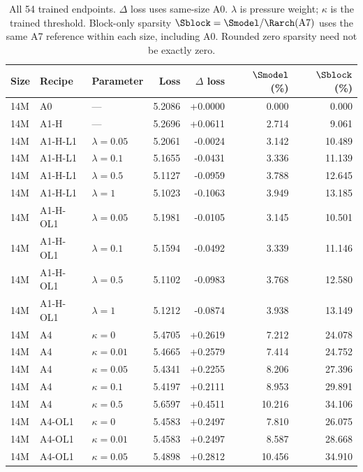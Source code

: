 \begin{table}[p]\centering\small\renewcommand{\arraystretch}{0.95}
\caption{All 54 trained endpoints. $\Delta$ loss uses same-size A0. $\lambda$ is pressure weight; $\kappa$ is the trained threshold. Block-only sparsity $\Sblock=\Smodel/\Rarch(\mathrm{A7})$ uses the same A7 reference within each size, including A0. Rounded zero sparsity need not be exactly zero.}\label{tab:trained-endpoints}
\begin{tabular}{@{}lllrrrr@{}}
\toprule
Size & Recipe & Parameter & Loss & $\Delta$ loss & $\Smodel$ (\%) & $\Sblock$ (\%) \\
\midrule
14M & A0 & --- & 5.2086 & +0.0000 & 0.000 & 0.000 \\
14M & A1-H & --- & 5.2696 & +0.0611 & 2.714 & 9.061 \\
14M & A1-H-L1 & $\lambda=0.05$ & 5.2061 & -0.0024 & 3.142 & 10.489 \\
14M & A1-H-L1 & $\lambda=0.1$ & 5.1655 & -0.0431 & 3.336 & 11.139 \\
14M & A1-H-L1 & $\lambda=0.5$ & 5.1127 & -0.0959 & 3.788 & 12.645 \\
14M & A1-H-L1 & $\lambda=1$ & 5.1023 & -0.1063 & 3.949 & 13.185 \\
14M & A1-H-OL1 & $\lambda=0.05$ & 5.1981 & -0.0105 & 3.145 & 10.501 \\
14M & A1-H-OL1 & $\lambda=0.1$ & 5.1594 & -0.0492 & 3.339 & 11.146 \\
14M & A1-H-OL1 & $\lambda=0.5$ & 5.1102 & -0.0983 & 3.768 & 12.580 \\
14M & A1-H-OL1 & $\lambda=1$ & 5.1212 & -0.0874 & 3.938 & 13.149 \\
14M & A4 & $\kappa=0$ & 5.4705 & +0.2619 & 7.212 & 24.078 \\
14M & A4 & $\kappa=0.01$ & 5.4665 & +0.2579 & 7.414 & 24.752 \\
14M & A4 & $\kappa=0.05$ & 5.4341 & +0.2255 & 8.206 & 27.396 \\
14M & A4 & $\kappa=0.1$ & 5.4197 & +0.2111 & 8.953 & 29.891 \\
14M & A4 & $\kappa=0.5$ & 5.6597 & +0.4511 & 10.216 & 34.106 \\
14M & A4-OL1 & $\kappa=0$ & 5.4583 & +0.2497 & 7.810 & 26.075 \\
14M & A4-OL1 & $\kappa=0.01$ & 5.4583 & +0.2497 & 8.587 & 28.668 \\
14M & A4-OL1 & $\kappa=0.05$ & 5.4898 & +0.2812 & 10.456 & 34.910 \\

\end{tabular}
\end{table}
